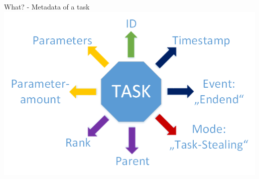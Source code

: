 	\begin{frame}{What? - Metadata of a task}
	\includegraphics[width=1.0\textwidth]{images/Task/Zeichnung4.png}
	\end{frame}
	
